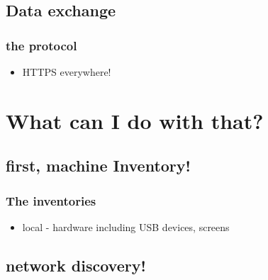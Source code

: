 \documentclass{beamer}
\begin{document}
\subsection{Data exchange}
\begin{frame}
\frametitle{the protocol}
%
\begin{itemize}
\item HTTPS everywhere! 
%
\end{itemize}
\end{frame}



\section{What can I do with that?}
\subsection{first, machine Inventory!}
\begin{frame}
\frametitle{The inventories}

\begin{itemize}
%
\item local - hardware including USB devices, screens
%
\end{itemize}
\end{frame}
\subsection{network discovery!}

\end{document}
